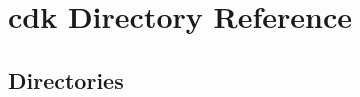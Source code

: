 \section{cdk Directory Reference}
\label{dir_58000412575b117fc0d91f3e6dbd532f}
\subsection*{Directories}
\begin{DoxyCompactItemize}
\end{DoxyCompactItemize}
